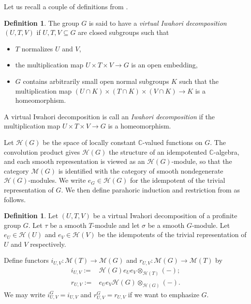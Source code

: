 \documentclass[10pt, letterpaper]{amsart}
\theoremstyle{plain}
\theoremstyle{definition}
\newtheorem{Def}[equation]{Definition}
\numberwithin{equation}{section}
\newcommand{\Hcal}{\mathcal{H}}
\begin{document}
Let us recall a couple of definitions from \cite{D09,CMO19}.

\begin{Def}
	The group $G$ is said to have a {\it virtual Iwahori decomposition} $(U,T,V)$ if $U,T,V\subseteq G$ are closed subgroups such that 
	\begin{itemize}
		\item $T$ normalizes $U$ and $V$,
		\item the multiplication map $U\times T\times V\rightarrow G$ is an open embedding,
		\item $G$ contains arbitrarily small open normal subgroups $K$ such that the multiplication map $(U\cap K)\times (T\cap K)\times (V\cap K)\rightarrow K$ is a homeomorphism.
	\end{itemize}
	A virtual Iwahori decomposition is call an {\it Iwahori decomposition} if the multiplication map $U\times T\times V\rightarrow G$ is a homeomorphism.
\end{Def}

Let $\Hcal(G)$ be the space of locally constant $\mathbb{C}$-valued functions on $G$. The convolution product gives $\Hcal(G)$ the structure of an idempotented $\mathbb{C}$-algebra, and each smooth representation is viewed as an $\Hcal(G)$-module, so that the category $\mathcal{M}(G)$ is identified with the category of smooth nondegenerate $\Hcal(G)$-modules. We write $e_G\in\Hcal(G)$ for the idempotent of the trivial representation of $G$. We then define parahoric induction and restriction from \cite{D09,CMO19} as follows.

\begin{Def}
	Let $(U,T,V)$ be a virtual Iwahori decomposition of a profinite group $G$. Let $\tau$ be a smooth $T$-module and let $\sigma$ be a smooth $G$-module. Let $e_{U}\in\Hcal(U)$ and $e_{V}\in\Hcal(V)$ be the idempotents of the trivial representation of $U$ and $V$ respectively. 
	
	Define functors $i_{U,V}:\mathcal{M}(T)\rightarrow \mathcal{M}(G)$ and $r_{U,V}:\mathcal{M}(G)\rightarrow \mathcal{M}(T)$ by
	\begin{align*}
		i_{U,V}:=&\Hcal(G)e_{U}e_{V}\otimes_{\Hcal(T)}(-);\\	
		r_{U,V}:=&e_{U}e_{V}\Hcal(G)\otimes_{\Hcal(G)}(-).
	\end{align*}
    We may write $i_{U,V}^{G}=i_{U,V}$ and $r_{U,V}^{G}=r_{U,V}$ if we want to emphasize $G$.
\end{Def}
\end{document}
